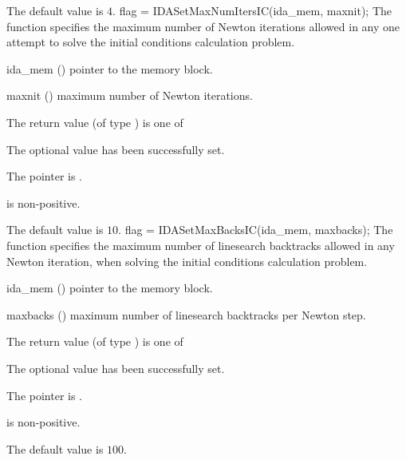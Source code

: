 {{\begin{args}
  \end{args}
}
{
  The default value is $4$.
}
{
flag = IDASetMaxNumItersIC(ida\_mem, maxnit);
}
{
  The function  specifies the maximum
  number of Newton iterations allowed in any one attempt to solve
  the initial conditions calculation problem.
}
{
  \begin{args}
  \item[ida\_mem] ()
    pointer to the {\idas} memory block.
  \item[maxnit] ()
    maximum number of Newton iterations.
  \end{args}
}
{
  The return value  (of type ) is one of
  \begin{args}
  \item[\Id{IDA\_SUCCESS}] 
    The optional value has been successfully set.
  \item[\Id{IDA\_MEM\_NULL}]
    The  pointer is .
  \item[\Id{IDA\_ILL\_INPUT}]
     is non-positive.
  \end{args}
}
{
  The default value is $10$.
}
{
flag = IDASetMaxBacksIC(ida\_mem, maxbacks);
}
{
  The function  specifies the maximum number
  of linesearch backtracks allowed in any Newton iteration, when solving
  the initial conditions calculation problem.
}
{
  \begin{args}
  \item[ida\_mem] ()
    pointer to the {\ida} memory block.
  \item[maxbacks] ()
    maximum number of linesearch backtracks per Newton step.
  \end{args}
}
{
  The return value  (of type ) is one of
  \begin{args}
  \item[\Id{IDA\_SUCCESS}] 
    The optional value has been successfully set.
  \item[\Id{IDA\_MEM\_NULL}]
    The  pointer is .
  \item[\Id{IDA\_ILL\_INPUT}]
     is non-positive.
  \end{args}
}
{
  The default value is $100$.

}}
